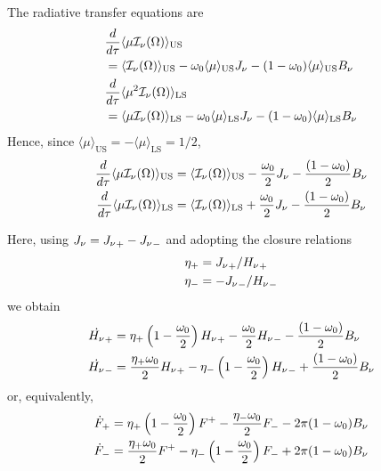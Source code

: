The radiative transfer equations are
\begin{align}
\label{eq:ratvvx}
 &\frac{d  }{d \tau} \langle\mu  {\mathcal{I}_\nu} (\Omega) \rangle_\mathrm{US} \nonumber \\
 &=  \langle {\mathcal{I}_\nu}(\Omega) \rangle_\mathrm{US}  - \omega_0 \langle \mu  \rangle_\mathrm{US} J_\nu - (1-\omega_0) \langle\mu \rangle_\mathrm{US} B_\nu \\
 \label{eq:ratvv2x}
 &\frac{d  }{d \tau} \langle\mu^2  {\mathcal{I}_\nu} (\Omega) \rangle_\mathrm{LS} \nonumber \\
 &=  \langle\mu {\mathcal{I}_\nu}(\Omega) \rangle_\mathrm{LS} - \omega_0 \langle \mu \rangle_\mathrm{LS} J_\nu  - (1-\omega_0)\langle\mu \rangle_\mathrm{LS} B_\nu  
 \end{align}
Hence, since $\langle \mu \rangle_\mathrm{US}=-\langle \mu \rangle_\mathrm{LS}=1/2$,
\begin{align}
\label{eq:ratvv}
 \frac{d  }{d \tau} \langle\mu  {\mathcal{I}_\nu} (\Omega) \rangle_\mathrm{US}  &=  \langle{\mathcal{I}_\nu}(\Omega) \rangle_\mathrm{US} - \frac{\omega_0}{2} J_\nu  - \frac{(1-\omega_0)}{2} B_\nu  \\
 \label{eq:ratvv2}
 \frac{d  }{d \tau} \langle\mu  {\mathcal{I}_\nu} (\Omega) \rangle_\mathrm{LS}  &=  \langle {\mathcal{I}_\nu}(\Omega) \rangle_\mathrm{LS}  + \frac{\omega_0}{2} J_\nu - \frac{(1-\omega_0)}{2} B_\nu  
 \end{align}

Here, using ${J_\nu} = {J_\nu}_+ - {J_\nu}_-$ and adopting the closure relations
\begin{align}
\eta_+ &= {J_\nu}_+/{H_\nu}_+ \\
\eta_- &= - {J_\nu}_-/{H_\nu}_- 
\end{align}
we obtain
\begin{align}
\label{eq:ratvvA}
\dot{{H_\nu}}_+ &= \eta_+ \left( 1 - \frac{\omega_0}{2}\right) {H_\nu}_+ - \frac{ \omega_0}{2}  {H_\nu}_- - \frac{(1-\omega_0)}{2} B_\nu  \\
 \label{eq:ratvv2A}
 \dot{{H_\nu}}_- &= \frac{\eta_+ \omega_0}{2} {H_\nu}_+ -  \eta_- \left( 1 - \frac{ \omega_0}{2}\right) {H_\nu}_- + \frac{(1-\omega_0)}{2} B_\nu
 \end{align}
or, equivalently,
\begin{align}
\label{eq:ratvvA}
\dot{F}_+ &= \eta_+ \left( 1 - \frac{\omega_0}{2}\right) F^+ -  \frac{\eta_- \omega_0}{2}  F_- - 2 \pi (1-\omega_0) B_\nu  \\
 \label{eq:ratvv2A}
 \dot{F}_- &= \frac{\eta_+ \omega_0}{2} F^+ -  \eta_- \left( 1 - \frac{ \omega_0}{2}\right) F_- + 2 \pi (1-\omega_0) B_\nu
 \end{align}

